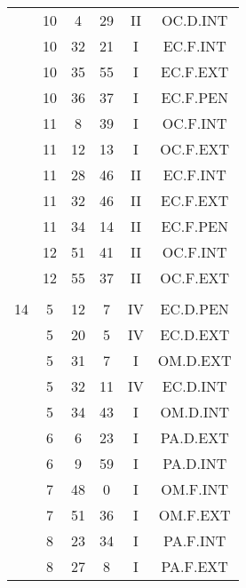 \documentclass[12pt, a4paper]{article}
\begin{document}
\begin{multicols}{3}
{\begin{tabular}{c c c c c c}
	 	 	 	 & 10 & 4 & 29 & II & OC.D.INT\\%
	 	 	 	 & 10 & 32 & 21 & I & EC.F.INT\\%
	 	 	 	 & 10 & 35 & 55 & I & EC.F.EXT\\%
	 	 	 	 & 10 & 36 & 37 & I & EC.F.PEN\\%
	 	 	 	 & 11 & 8 & 39 & I & OC.F.INT\\%
	 	 	 	 & 11 & 12 & 13 & I & OC.F.EXT\\%
	 	 	 	 & 11 & 28 & 46 & II & EC.F.INT\\%
	 	 	 	 & 11 & 32 & 46 & II & EC.F.EXT\\%
	 	 	 	 & 11 & 34 & 14 & II & EC.F.PEN\\%
	 	 	 	 & 12 & 51 & 41 & II & OC.F.INT\\%
	 	 	 	 & 12 & 55 & 37 & II & OC.F.EXT\\%
	 	 	 	 & & & & & \\%
	 	 	 	14 & 5 & 12 & 7 & IV & EC.D.PEN\\%
	 	 	 	 & 5 & 20 & 5 & IV & EC.D.EXT\\%
	 	 	 	 & 5 & 31 & 7 & I & OM.D.EXT\\%
	 	 	 	 & 5 & 32 & 11 & IV & EC.D.INT\\%
	 	 	 	 & 5 & 34 & 43 & I & OM.D.INT\\%
	 	 	 	 & 6 & 6 & 23 & I & PA.D.EXT\\%
	 	 	 	 & 6 & 9 & 59 & I & PA.D.INT\\%
	 	 	 	 & 7 & 48 & 0 & I & OM.F.INT\\%
	 	 	 	 & 7 & 51 & 36 & I & OM.F.EXT\\%
	 	 	 	 & 8 & 23 & 34 & I & PA.F.INT\\%
	 	 	 	 & 8 & 27 & 8 & I & PA.F.EXT\\%

\end{tabular}}
\end{multicols}
\end{document}
